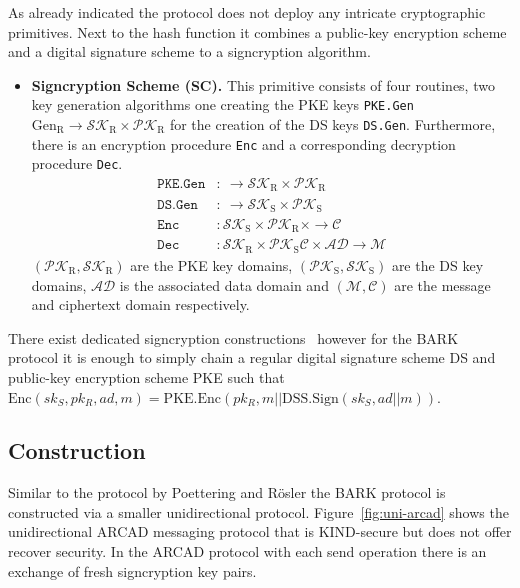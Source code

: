 \documentclass[11pt,a4paper,twoside,openright,bibliography=totoc]{scrbook}
\renewcommand{\t}{\text} %
\begin{document}
As already indicated the protocol does not deploy any intricate
cryptographic primitives. Next to the hash function it combines a
public-key encryption scheme and a digital signature scheme to
a signcryption algorithm.
\begin{itemize}
\item \textbf{Signcryption Scheme (SC).} This primitive consists of four routines,
  two key generation algorithms one creating the PKE keys \texttt{PKE.Gen}
  $\t{Gen}_\t{R} \rightarrow \mathcal{SK}_\t{R} \times \mathcal{PK}_\t{R}$
  for the creation of the DS keys \texttt{DS.Gen}. Furthermore,
  there is an encryption procedure \texttt{Enc} and a corresponding
  decryption procedure \texttt{Dec}.
  \begin{align*}
    \texttt{PKE.Gen} & : \ \rightarrow \mathcal{SK}_\t{R} \times \mathcal{PK}_\t{R} \\
    \texttt{DS.Gen} & : \ \rightarrow \mathcal{SK}_\t{S} \times \mathcal{PK}_\t{S} \\
    \texttt{Enc} & : \mathcal{SK}_\t{S} \times \mathcal{PK}_\t{R} \times
                   \rightarrow \mathcal{C} \\
    \texttt{Dec} & : \mathcal{SK}_\t{R} \times \mathcal{PK}_\t{S}
  \mathcal{C} \times \mathcal{AD} \rightarrow \mathcal{M}
  \end{align*}
  $(\mathcal{PK}_\t{R},\mathcal{SK}_\t{R})$ are the PKE key domains,
  $(\mathcal{PK}_\t{S},\mathcal{SK}_\t{S})$ are the DS key domains, $\mathcal{AD}$
  is the associated data domain and $(\mathcal{M}, \mathcal{C})$ are
  the message and ciphertext domain respectively.
\end{itemize}

There exist dedicated signcryption constructions~\cite{zheng1997digital}
however for the BARK protocol
it is enough to simply chain a regular digital signature scheme DS and
public-key encryption scheme PKE
such that $\t{Enc}(sk_S,pk_R,ad,m) = \t{PKE.Enc}(pk_R,m || \t{DSS.Sign}(sk_S,ad || m))$.

\subsection{Construction}
\label{sec:construction-2}

Similar to the protocol by Poettering and Rösler the BARK protocol is
constructed via a smaller unidirectional protocol. Figure~\ref{fig:uni-arcad}
shows the unidirectional ARCAD messaging protocol that is KIND-secure but
does not offer recover security. In the ARCAD protocol with each send operation
there is an exchange of fresh signcryption key pairs.
\end{document}

